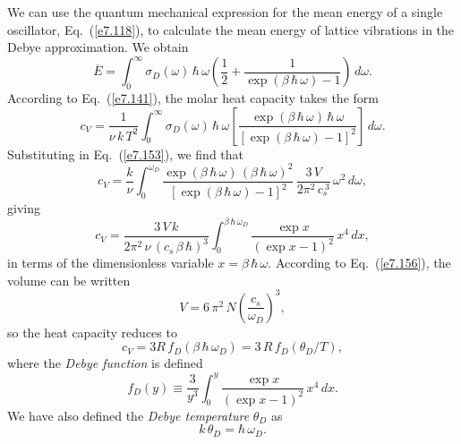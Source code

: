 We can  use the quantum mechanical expression for the 
mean energy of a single oscillator, Eq.~(\ref{e7.118}), to calculate the mean
energy of lattice vibrations in the Debye approximation. We obtain
\begin{equation}
\overline{E} = \int_0^\infty \sigma_D(\omega) \,\hbar\,\omega
\left(\frac{1}{2} + \frac{1}{\exp(\beta\,\hbar\, \omega)-1}\right)\,d\omega.
\end{equation}
According to Eq.~(\ref{e7.141}), the molar heat capacity takes the form
\begin{equation}
c_V = \frac{1}{\nu\, k\, T^2} \int_0^\infty \sigma_D (\omega)
\, \hbar\,\omega\left[\frac{\exp(\beta\,\hbar\, \omega)\,\hbar\,\omega}
{[\exp(\beta\,\hbar\,\omega)-1]^2}\right]\,d\omega.
\end{equation}
Substituting in Eq.~(\ref{e7.153}), we find that
\begin{equation}
c_V = \frac{k}{\nu}\int_0^{\omega_D} \frac{\exp(\beta\,\hbar\,\omega)\,(\beta\,
\hbar\,\omega)^2}
{[\exp(\beta\,\hbar\,\omega)-1]^2}\,
\frac{3 \,V}{2\pi^2 \,c_s^{~3}}\,\omega^2\,d\omega,
\end{equation}
giving
\begin{equation}
c_V = \frac{3\,V\, k}{2\pi^2 \,\nu\,(c_s \,\beta \,\hbar)^3}\int_0^{\beta\,\hbar\,\omega_D} 
\frac{\exp x}{(\exp x - 1)^2}\,x^4\,dx,
\end{equation}
in terms of the dimensionless variable $x=\beta\,\hbar\,\omega$.
According to Eq.~(\ref{e7.156}), the volume can be written
\begin{equation}
V = 6\,\pi^2\, N \left(\frac{c_s}{\omega_D}\right)^3,
\end{equation}
so the heat capacity reduces to
\begin{equation}
c_V = 3R\,f_D(\beta \,\hbar\,\omega_D)= 3\,R\,f_D(\theta_D/T),
\end{equation}
where the {\em Debye function}\/ is defined
\begin{equation}
f_D(y) \equiv \frac{3}{y^3}\int_0^y \frac{\exp x}
{(\exp x -1)^2}\,x^4\,dx.\label{e7.163}
\end{equation}
We have also defined the {\em Debye temperature}\/ $\theta_D$ as
\begin{equation}
k\,\theta_D = \hbar \,\omega_D.
\end{equation}

